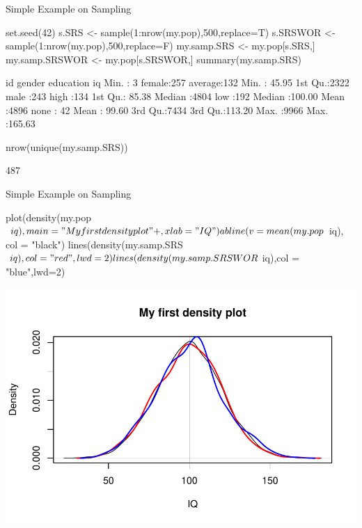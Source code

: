\documentclass[11pt,german,hideothersubsections]{beamer}
\begin{document}
\begin{frame}[fragile]{Simple Example on Sampling}
\footnotesize{
\begin{Schunk}
\begin{Sinput}
 set.seed(42)
 s.SRS <- sample(1:nrow(my.pop),500,replace=T)
 s.SRSWOR <- sample(1:nrow(my.pop),500,replace=F)
 my.samp.SRS <- my.pop[s.SRS,]
 my.samp.SRSWOR <- my.pop[s.SRSWOR,]
 summary(my.samp.SRS)
\end{Sinput}
\begin{Soutput}
       id          gender      education         iq        
 Min.   :   3   female:257   average:132   Min.   : 45.95  
 1st Qu.:2322   male  :243   high   :134   1st Qu.: 85.38  
 Median :4804                low    :192   Median :100.00  
 Mean   :4896                none   : 42   Mean   : 99.60  
 3rd Qu.:7434                              3rd Qu.:113.20  
 Max.   :9966                              Max.   :165.63  
\end{Soutput}
\begin{Sinput}
 nrow(unique(my.samp.SRS))
\end{Sinput}
\begin{Soutput}
[1] 487
\end{Soutput}
\end{Schunk}
}
\end{frame}
\begin{frame}[fragile]{Simple Example on Sampling}
\begin{Schunk}
\begin{Sinput}
 plot(density(my.pop$iq),main = "My first density plot"
+      , xlab = "IQ")
 abline(v=mean(my.pop$iq), col = "black")
 lines(density(my.samp.SRS$iq),col = "red",lwd=2)
 lines(density(my.samp.SRSWOR$iq),col = "blue",lwd=2)
\end{Sinput}
\end{Schunk}
\includegraphics{Day1-015}
\end{frame}
\end{document}
